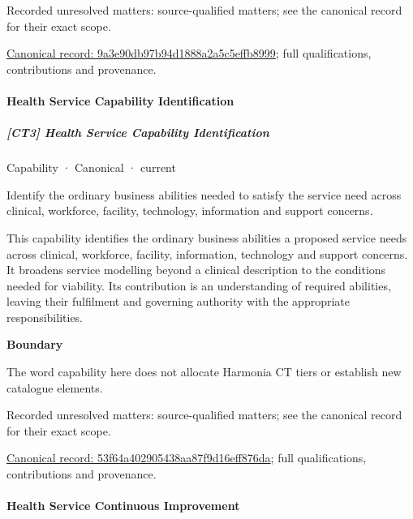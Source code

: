 {\small Recorded unresolved matters: source-qualified matters; see the canonical record for their exact scope.}\par
{\footnotesize \href{../../../../continuum/strategy/capability/9a3e90db97b94d1888a2a5c5effb8999.md}{Canonical record: 9a3e90db97b94d1888a2a5c5effb8999}; full qualifications, contributions and provenance.}\par
\paragraph{Health Service Capability Identification}

\subparagraph{[CT3] Health Service Capability Identification}

\label{element:53f64a402905438aa87f9d16eff876da}
{\small Capability · Canonical · current}\par

Identify the ordinary business abilities needed to satisfy the service need across clinical, workforce, facility, technology, information and support concerns.



This capability identifies the ordinary business abilities a proposed service needs across clinical, workforce, facility, information, technology and support concerns. It broadens service modelling beyond a clinical description to the conditions needed for viability. Its contribution is an understanding of required abilities, leaving their fulfilment and governing authority with the appropriate responsibilities.



\textbf{Boundary}



The word capability here does not allocate Harmonia CT tiers or establish new catalogue elements.


{\small Recorded unresolved matters: source-qualified matters; see the canonical record for their exact scope.}\par
{\footnotesize \href{../../../../continuum/strategy/capability/53f64a402905438aa87f9d16eff876da.md}{Canonical record: 53f64a402905438aa87f9d16eff876da}; full qualifications, contributions and provenance.}\par
\paragraph{Health Service Continuous Improvement}

